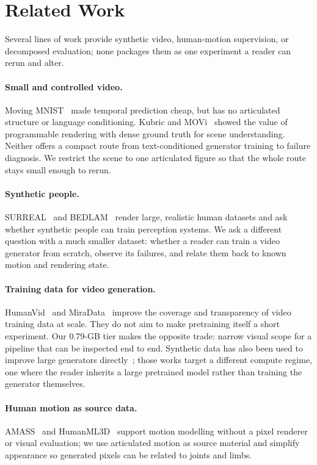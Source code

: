 \documentclass[10pt,twocolumn]{article}
\begin{document}
\section{Related Work}
Several lines of work provide synthetic video, human-motion supervision, or decomposed evaluation; none
packages them as one experiment a reader can rerun and alter.

\paragraph{Small and controlled video.} Moving MNIST~\cite{srivastava2015unsupervised} made temporal prediction
cheap, but has no articulated structure or language conditioning. Kubric and MOVi~\cite{greff2022kubric} showed
the value of programmable rendering with dense ground truth for scene understanding. Neither offers a compact
route from text-conditioned generator training to failure diagnosis. We restrict the scene to one articulated
figure so that the whole route stays small enough to rerun.

\paragraph{Synthetic people.} SURREAL~\cite{varol2017surreal} and BEDLAM~\cite{black2023bedlam} render large,
realistic human datasets and ask whether synthetic people can train perception systems. We ask a different
question with a much smaller dataset: whether a reader can train a video generator from scratch, observe its
failures, and relate them back to known motion and rendering state.

\paragraph{Training data for video generation.} HumanVid~\cite{wang2024humanvid} and
MiraData~\cite{ju2024miradata} improve the coverage and transparency of video training data at scale. They do
not aim to make pretraining itself a short experiment. Our 0.79-GB tier makes the opposite trade: narrow visual
scope for a pipeline that can be inspected end to end. Synthetic data has also been used to improve large
generators directly~\cite{zhao2025synthetic,jin2026dynavid}; those works target a different compute regime, one
where the reader inherits a large pretrained model rather than training the generator themselves.

\paragraph{Human motion as source data.} AMASS~\cite{mahmood2019amass} and HumanML3D~\cite{guo2022humanml3d}
support motion modelling without a pixel renderer or visual evaluation; we use articulated motion as source
material and simplify appearance so generated pixels can be related to joints and limbs.
\end{document}
